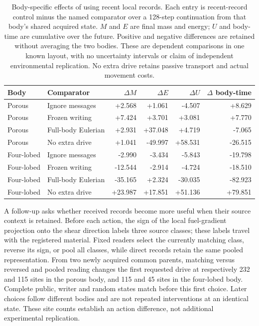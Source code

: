 \begin{table}[htbp]
\centering
\small
\begin{tabular}{llrrrr}
\hline
Body & Comparator & $\Delta M$ & $\Delta E$ & $\Delta U$ & $\Delta$ body-time \\
\hline
Porous & Ignore messages & +2.568 & +1.061 & -4.507 & +8.629 \\
Porous & Frozen writing & +7.424 & +3.701 & +3.081 & +7.770 \\
Porous & Full-body Eulerian & +2.931 & +37.048 & +4.719 & -7.065 \\
Porous & No extra drive & +1.041 & -49.997 & +58.531 & -26.515 \\
Four-lobed & Ignore messages & -2.990 & -3.434 & -5.843 & -19.798 \\
Four-lobed & Frozen writing & -12.544 & -2.914 & -4.724 & -18.510 \\
Four-lobed & Full-body Eulerian & -35.165 & +2.324 & -30.035 & -82.923 \\
Four-lobed & No extra drive & +23.987 & +17.851 & +51.136 & +79.851 \\
\hline
\end{tabular}
\caption{Body-specific effects of using recent local records. Each entry is recent-record control minus the named comparator over a 128-step continuation from that body's shared acquired state. $M$ and $E$ are final mass and energy; $U$ and body-time are cumulative over the future. Positive and negative differences are retained without averaging the two bodies. These are dependent comparisons in one known layout, with no uncertainty intervals or claim of independent environmental replication. No extra drive retains passive transport and actual movement costs.}
\label{tab:terminal-bodies}
\end{table}

A follow-up asks whether received records become more useful when their source context is retained. Before each action, the sign of the local fuel-gradient projection onto the shear direction labels three source classes; these labels travel with the registered material. Fixed readers select the currently matching class, reverse its sign, or pool all classes, while direct records retain the same pooled representation. From two newly acquired common parents, matching versus reversed and pooled reading changes the first requested drive at respectively 232 and 115 sites in the porous body, and 115 and 45 sites in the four-lobed body. Complete public, writer and random states match before this first choice. Later choices follow different bodies and are not repeated interventions at an identical state. These site counts establish an action difference, not additional experimental replication.

